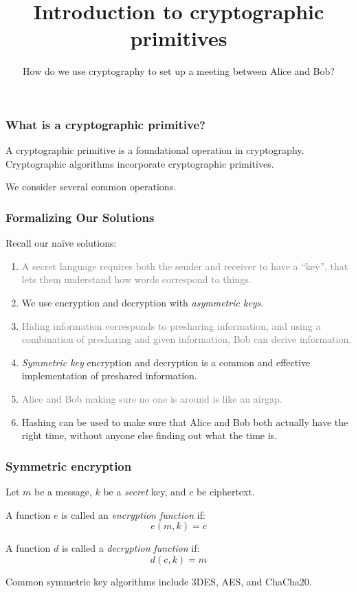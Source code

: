 \documentclass[red]{beamer}
\begin{document}
\title{Introduction to cryptographic primitives}
\author{How do we use cryptography to set up a meeting between Alice and Bob?}
\date{}
\begin{frame}
\maketitle
\end{frame}

\begin{frame}\frametitle{What is a cryptographic primitive?}
\pause
\begin{definition}
A cryptographic primitive is a foundational operation in cryptography.
Cryptographic algorithms incorporate cryptographic primitives.
\end{definition}

\pause
We consider several common operations.

\end{frame}

\begin{frame}\frametitle{Formalizing Our Solutions}
Recall our na\"ive solutions:
\begin{enumerate}
\item \textcolor{gray}{A secret language requires both the sender and receiver to have a ``key'', that lets them understand how words correspond to things.}
\item[] We use encryption and decryption with \emph{asymmetric keys}. %

\pause
\item \textcolor{gray}{Hiding information corresponds to presharing information, and using a combination of presharing and given information, Bob can derive information.}
\item[] \emph{Symmetric key} encryption and decryption is a common and effective implementation of preshared information. %

\pause
\item \textcolor{gray}{Alice and Bob making sure no one is around is like an airgap.}
\item[] Hashing can be used to make sure that Alice and Bob both actually have the right time, without anyone else finding out what the time is.

\pause
\end{enumerate}
\end{frame}

\begin{frame}\frametitle{Symmetric encryption}
\pause
Let \(m\) be a message, \(k\) be a \emph{secret} key, and \(c\) be ciphertext.
\pause
\begin{definition}[Encryption]
A function \(e\) is called an \emph{encryption function} if:
\[
e(m,k) = c
\]
\end{definition}
\pause
\begin{definition}[Decryption]
A function \(d\) is called a \emph{decryption function} if:
\[
d(c,k) = m
\]
\end{definition}
\pause
Common symmetric key algorithms include 3DES, AES, and ChaCha20.
\end{frame}
\end{document}
